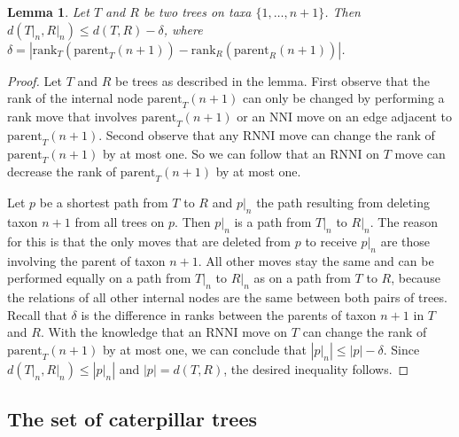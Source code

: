 \documentclass{amsart}
\newcommand{\parent}{\mathrm{parent}}
\newcommand{\rank}{\mathrm{rank}}
\newcommand{\nni}{\mathrm{NNI}}
\newcommand{\rnni}{\mathrm{RNNI}}
\newtheorem{lemma}[definition]{Lemma}
\begin{document}
\begin{lemma}
Let $T$ and $R$ be two trees on taxa $\{1, \ldots, n+1\}$.
Then $d(T{\big|}_n, R{\big|}_n) \leq d(T,R) - \delta$, where $\delta = |\rank_T(\parent_T(n+1)) - \rank_R(\parent_R(n+1))|$.
\label{lemma:distance_delete_taxon}
\end{lemma}

\begin{proof}
Let $T$ and $R$ be trees as described in the lemma.
First observe that the rank of the internal node $\parent_T(n+1)$ can only be changed by performing a rank move that involves $\parent_T(n+1)$ or an $\nni$ move on an edge adjacent to $\parent_T(n+1)$.
Second observe that any $\rnni$ move can change the rank of $\parent_T(n+1)$ by at most one.
So we can follow that an $\rnni$ on $T$ move can decrease the rank of $\parent_T(n+1)$ by at most one.

Let $p$ be a shortest path from $T$ to $R$ and $p{\big|}_n$ the path resulting from deleting taxon $n+1$ from all trees on $p$.
Then $p{\big|}_n$ is a path from $T{\big|}_n$ to $R{\big|}_n$.
The reason for this is that the only moves that are deleted from $p$ to receive $p{\big|}_n$ are those involving the parent of taxon $n+1$.
All other moves stay the same and can be performed equally on a path from $T{\big|}_n$ to $R{\big|}_n$ as on a path from $T$ to $R$, because the relations of all other internal nodes are the same between both pairs of trees.
Recall that $\delta$ is the difference in ranks between the parents of taxon $n+1$ in $T$ and $R$.
With the knowledge that an $\rnni$ move on $T$ can change the rank of $\parent_T(n+1)$ by at most one, we can conclude that $|p{\big|}_n| \leq |p| - \delta$.
Since $d(T{\big|}_n,R{\big|}_n) \leq |p{\big|}_n|$ and $|p| = d(T,R)$, the desired inequality follows.
\end{proof}


\subsection{The set of caterpillar trees}
\label{section:caterpillar_convex}
\end{document}
